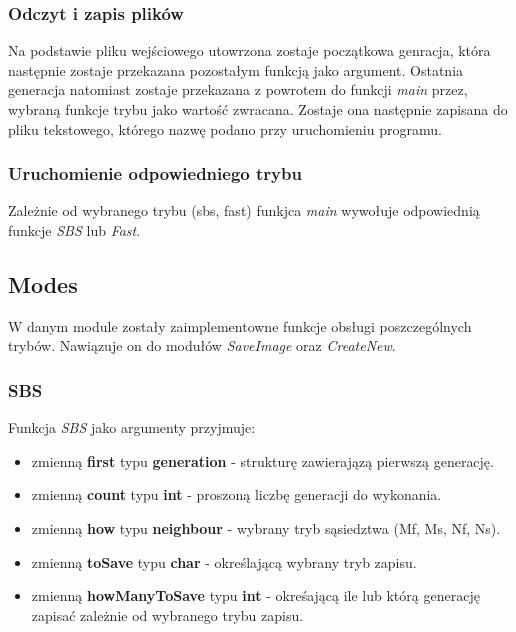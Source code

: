 \documentclass[a4paper]{article}
\begin{document}
\subsubsection{Odczyt i zapis plik\'ow}

\quad Na podstawie pliku wej\'sciowego utowrzona zostaje pocz\k{a}tkowa genracja, kt\'ora nast\k{e}pnie zostaje przekazana pozosta\l{}ym funkcj\k{a} jako argument.
Ostatnia generacja natomiast zostaje przekazana z powrotem do funkcji \textit{main} przez, wybran\k{a} funkcje trybu jako warto\'s\'c zwracana.
Zostaje ona nast\k{e}pnie zapisana do pliku tekstowego, kt\'orego nazw\k{e} podano przy uruchomieniu programu.

\subsubsection{Uruchomienie odpowiedniego trybu}

\quad Zale\.znie od wybranego trybu (sbs, fast) funkjca \textit{main} wywo\l{}uje odpowiedni\k{a} funkcje \textit{SBS} lub \textit{Fast}.


\subsection{Modes}

\quad W danym module zosta\l{}y zaimplementowne funkcje obs\l{}ugi poszczeg\'olnych tryb\'ow. 
Nawi\k{a}zuje on do modu\l{}\'ow \textit{SaveImage} oraz \textit{CreateNew}. 

\subsubsection{SBS}

\quad Funkcja \textit{SBS} jako argumenty przyjmuje:
\begin{itemize}
	\item zmienn\k{a} \textbf{first} typu \textbf{generation} - struktur\k{e} zawieraj\k{a}z\k{a} pierwsz\k{a} generacj\k{e}.
	\item zmienn\k{a} \textbf{count} typu \textbf{int} - proszon\k{a} liczb\k{e} generacji do wykonania.
	\item zmienn\k{a} \textbf{how} typu \textbf{neighbour} - wybrany tryb s\k{a}siedztwa (Mf, Ms, Nf, Ns).
	\item zmienn\k{a} \textbf{toSave} typu \textbf{char} - okre\'slaj\k{a}c\k{a} wybrany tryb zapisu.
	\item zmienn\k{a} \textbf{howManyToSave} typu \textbf{int} - okre\'saj\k{a}c\k{a} ile lub kt\'or\k{a} generacj\k{e} zapisa\'c zale\.znie od wybranego trybu zapisu.
\end{itemize}
\end{document}
